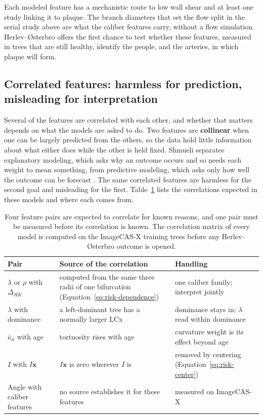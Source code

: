Each modeled feature has a mechanistic route to low wall shear and at least one study linking it to plaque.
The branch diameters that set the flow split in the serial study above \cite{sakellarios2017bifurcation} are what the caliber features carry, without a flow simulation.
Herlev--{\O}sterbro offers the first chance to test whether these features, measured in trees that are still healthy, identify the people, and the arteries, in which plaque will form.

\subsection{Correlated features: harmless for prediction, misleading for interpretation}
\label{sec:risk-collinearity}

Several of the features are correlated with each other, and whether that matters depends on what the models are asked to do.
Two features are \textbf{collinear} when one can be largely predicted from the others, so the data hold little information about what either does while the other is held fixed.
Shmueli separates explanatory modeling, which asks why an outcome occurs and so needs each weight to mean something, from predictive modeling, which asks only how well the outcome can be forecast \cite{shmueli2010explain}.
The same correlated features are harmless for the second goal and misleading for the first.
Table~\ref{tab:risk-correlations} lists the correlations expected in these models and where each comes from.

\begin{table}[tbp]
  \centering
  \small
  \caption{Four feature pairs are expected to correlate for known reasons, and one pair must be measured before its correlation is known.
    The correlation matrix of every model is computed on the ImageCAS-X training trees before any Herlev--{\O}sterbro outcome is opened.}
  \label{tab:risk-correlations}
  \begin{tabular}{@{}p{3.6cm}p{5.4cm}p{5.2cm}@{}}
    \toprule
    Pair & Source of the correlation & Handling \\
    \midrule
    $\lambda$ or $\rho$ with $\Delta_{HK}$ & computed from the same three radii of one bifurcation (Equation~\ref{eq:risk-dependence}) & one caliber family; interpret jointly \\
    $\lambda$ with dominance & a left-dominant tree has a normally larger LCx \cite{dodge1992diameter} & dominance stays in; $\lambda$ read within dominance \\
    $\bar\kappa_a$ with age & tortuosity rises with age \cite{kahe2020tortuosity} & curvature weight is its effect beyond age \\
    $I$ with $I\mathbf{x}$ & $I\mathbf{x}$ is zero wherever $I$ is & removed by centering (Equation~\ref{eq:risk-center}) \\
    Angle with caliber features & no source establishes it for these features & measured on ImageCAS-X \\
    \bottomrule
  \end{tabular}
\end{table}

